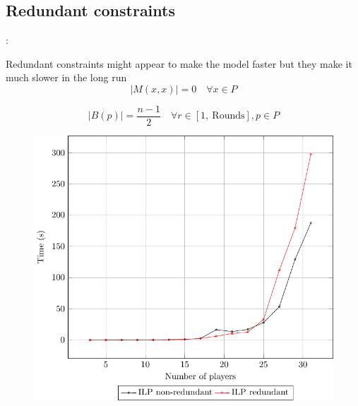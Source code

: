 \documentclass[
9pt,
aspectratio=169,
xcolor=table,
]{beamer}
\begin{document}
\subsection{Redundant constraints}
\begin{frame}{\secname: \subsecname}
    \begin{minipage}{0.40\textwidth}
	Redundant constraints might appear to make the model faster but they make it much slower in the long run
	\begin{equation*}
	    \label{noselfplay}
	    |M(x,x)| = 0 \quad \forall x \in P 
	\end{equation*}

	\begin{equation*}
	    \label{blackfairness}
	    |B(p)| = \frac{n-1}{2} \quad \forall r \in [1, \ \text{Rounds}], p \in P
	\end{equation*}

    \end{minipage}
    \hfill
    \begin{minipage}{0.57\textwidth}
	\begin{figure}[h]
	    \includegraphics[width=\linewidth]{../plots/time_per_instance.pdf}
	\end{figure}
    \end{minipage}

\end{frame}
\end{document}
